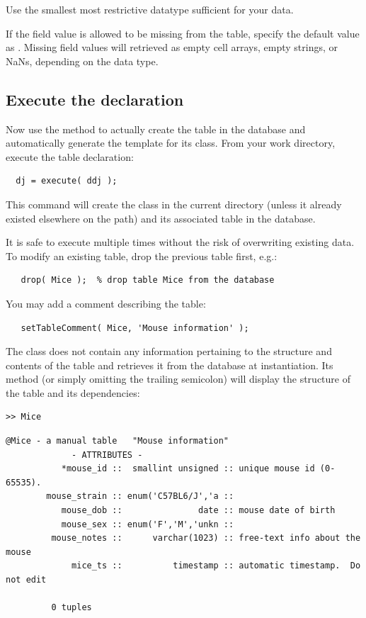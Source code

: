 \documentclass[10pt]{article}
\begin{document}
Use the smallest most restrictive datatype sufficient for your data.  

If the field value is allowed to be missing from the table, specify the default value as \mcode{[]}. Missing field values will retrieved as empty cell arrays, empty strings, or NaNs, depending on the data type.

\subsection{Execute the declaration}
Now use the  method to actually create the table in the database and automatically generate the template for its class. From your work directory, execute the table declaration:
\begin{lstlisting}
  dj = execute( ddj );
\end{lstlisting}

This command will create the class  in the current directory (unless it already existed elsewhere on the path) and its associated table in the database. 

It is safe to execute  multiple times without the risk of overwriting existing data. To modify an existing table, drop the previous table first, e.g.:
\begin{lstlisting}
   drop( Mice );  % drop table Mice from the database
\end{lstlisting}

You may add a comment describing the table:
\begin{lstlisting}
   setTableComment( Mice, 'Mouse information' );
\end{lstlisting}

The class  does not contain any information pertaining to the structure and contents of the table and retrieves it from the database at instantiation.  Its  method (or simply omitting the trailing semicolon) will display the structure of the table and its dependencies:

\begin{lstlisting}
>> Mice
\end{lstlisting}
\begin{scriptsize}
\begin{verbatim}
@Mice - a manual table   "Mouse information"
             - ATTRIBUTES -
           *mouse_id ::  smallint unsigned :: unique mouse id (0-65535).
        mouse_strain :: enum('C57BL6/J','a :: 
           mouse_dob ::               date :: mouse date of birth
           mouse_sex :: enum('F','M','unkn :: 
         mouse_notes ::      varchar(1023) :: free-text info about the mouse
             mice_ts ::          timestamp :: automatic timestamp.  Do not edit
         
         0 tuples
\end{verbatim}
\end{scriptsize}
\end{document}
